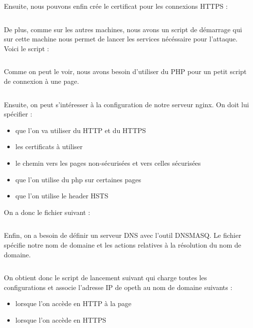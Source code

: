 \inputminted[bgcolor=lbcolor, breaklines]{shell}{../CA/create-ca.sh}

Ensuite, nous pouvons enfin crée le certificat pour les connexions HTTPS :

\inputminted[bgcolor=lbcolor, breaklines]{shell}{../CA/new-cert.sh}

De plus, comme sur les autres machines, nous avons un script de démarrage qui sur cette machine nous permet de lancer les services nécéssaire pour l'attaque. Voici le script :

\inputminted[bgcolor=lbcolor, breaklines]{shell}{../sslstrip2/opeth/start.sh}

Comme on peut le voir, nous avons besoin d'utiliser du PHP pour un petit script de connexion à une page.

\inputminted[bgcolor=lbcolor, breaklines]{shell}{../sslstrip2/opeth/php7.0-fpm.conf}

Ensuite, on peut s'intéresser à la configuration de notre serveur nginx. On doit lui spécifier :

\begin{itemize}
\item que l'on va utiliser du HTTP et du HTTPS
\item les certificats à utiliser
\item le chemin vers les pages non-sécurisées et vers celles sécurisées
\item que l'on utilise du php sur certaines pages
\item que l'on utilise le header HSTS
\end{itemize}

On a donc le fichier suivant  :

\inputminted[bgcolor=lbcolor, breaklines]{shell}{../sslstrip2/opeth/nginx.conf}

Enfin, on a besoin de définir un serveur DNS avec l'outil DNSMASQ. Le fichier  spécifie notre nom de domaine et les actions relatives à la résolution du nom de domaine.

\inputminted[bgcolor=lbcolor, breaklines]{shell}{../sslstrip2/opeth/dnsmasq.conf}

On obtient donc le script de lancement suivant qui charge toutes les configurations et associe l'adresse IP de opeth au nom de domaine suivants :

\begin{itemize}
\item {} lorsque l'on accède en HTTP à la page
\item {} lorsque l'on accède en HTTPS
\end{itemize}

